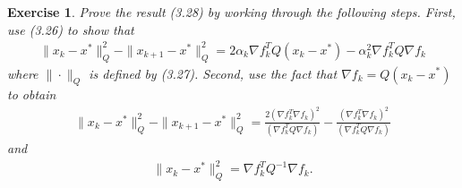 \documentclass[11pt,a4paper]{article}
\renewcommand{\(}{\left(}
\renewcommand{\)}{\right)}
\newtheorem{exercise}{Exercise}
\begin{document}
  \setcounter{exercise}{6}  
  \begin{exercise}
  	Prove the result (3.28) by working through the following steps. First, use (3.26) to show that
  	\begin{align*}
  	\|x_{k} - x^{*}\|^{2}_{Q}-\|x_{k+1} - x^{*}\|^{2}_{Q}=2\alpha_{k}\nabla f_{k}^{T}Q(x_{k} - x^{*})-\alpha_{k}^{2}\nabla f_{k}^{T}Q\nabla f_{k}
  	\end{align*}
  	where $\|\cdot\|_{Q}$ is defined by (3.27). Second, use the fact that $\nabla f_{k}=Q(x_{k} - x^{*})$ to obtain
  	\begin{align*}
  	\|x_{k} - x^{*}\|^2_{Q}-\|x_{k+1} - x^{*}\|^2_{Q}=\frac{2(\nabla f_{k}^{T}\nabla f_{k})^2}{(\nabla f^{T}_{k}Q\nabla f_{k})}-\frac{(\nabla f_{k}^{T}\nabla f_{k})^2}{(\nabla f^{T}_{k}Q\nabla f_{k})}
  	\end{align*}
  	and
  	\begin{align*}
  	\|x_{k} - x^{*}\|^{2}_{Q}=\nabla f_{k}^{T}Q^{-1}\nabla f_{k}.
  	\end{align*}
  \end{exercise}  
\end{document}
